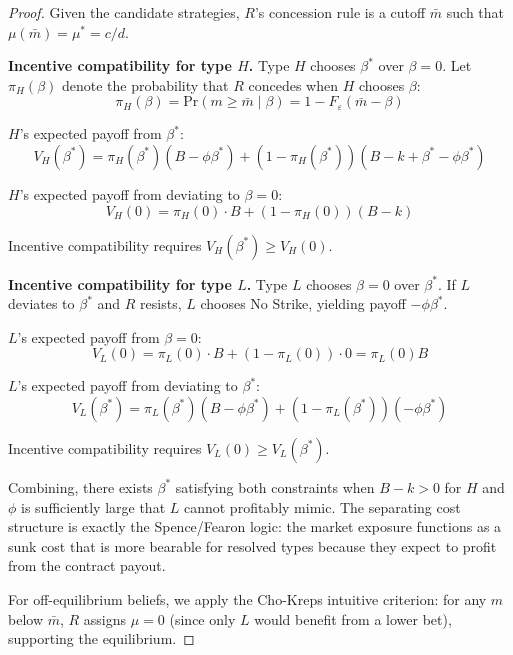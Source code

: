 \documentclass[12pt]{article}
\newcommand{\Pr}{\text{Pr}}
\begin{document}
\begin{proof}
Given the candidate strategies, $R$'s concession rule is a cutoff $\bar{m}$ such that $\mu(\bar{m}) = \mu^* = c/d$.

\textbf{Incentive compatibility for type $H$.} Type $H$ chooses $\beta^*$ over $\beta = 0$. Let $\pi_H(\beta)$ denote the probability that $R$ concedes when $H$ chooses $\beta$:
\begin{equation}
\pi_H(\beta) = \Pr(m \geq \bar{m} \mid \beta) = 1 - F_\varepsilon(\bar{m} - \beta)
\end{equation}

$H$'s expected payoff from $\beta^*$:
\begin{equation}
V_H(\beta^*) = \pi_H(\beta^*)(B - \phi\beta^*) + (1 - \pi_H(\beta^*))(B - k + \beta^* - \phi\beta^*)
\end{equation}

$H$'s expected payoff from deviating to $\beta = 0$:
\begin{equation}
V_H(0) = \pi_H(0) \cdot B + (1 - \pi_H(0))(B - k)
\end{equation}

Incentive compatibility requires $V_H(\beta^*) \geq V_H(0)$.

\textbf{Incentive compatibility for type $L$.} Type $L$ chooses $\beta = 0$ over $\beta^*$. If $L$ deviates to $\beta^*$ and $R$ resists, $L$ chooses No Strike, yielding payoff $-\phi\beta^*$.

$L$'s expected payoff from $\beta = 0$:
\begin{equation}
V_L(0) = \pi_L(0) \cdot B + (1 - \pi_L(0)) \cdot 0 = \pi_L(0) B
\end{equation}

$L$'s expected payoff from deviating to $\beta^*$:
\begin{equation}
V_L(\beta^*) = \pi_L(\beta^*)(B - \phi\beta^*) + (1 - \pi_L(\beta^*))(-\phi\beta^*)
\end{equation}

Incentive compatibility requires $V_L(0) \geq V_L(\beta^*)$.

Combining, there exists $\beta^*$ satisfying both constraints when $B - k > 0$ for $H$ and $\phi$ is sufficiently large that $L$ cannot profitably mimic. The separating cost structure is exactly the Spence/Fearon logic: the market exposure functions as a sunk cost that is more bearable for resolved types because they expect to profit from the contract payout.

For off-equilibrium beliefs, we apply the Cho-Kreps intuitive criterion: for any $m$ below $\bar{m}$, $R$ assigns $\mu = 0$ (since only $L$ would benefit from a lower bet), supporting the equilibrium.
\end{proof}
\end{document}
